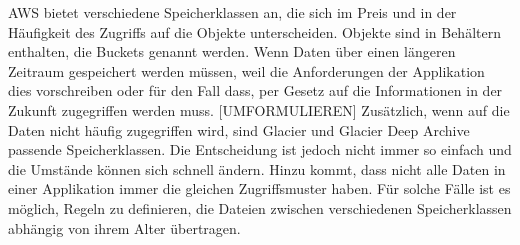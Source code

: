 AWS bietet verschiedene Speicherklassen an, die sich im Preis und in der Häufigkeit des Zugriffs auf die Objekte unterscheiden. Objekte sind in Behältern enthalten, die Buckets genannt werden. Wenn Daten über einen längeren Zeitraum gespeichert werden müssen, weil die Anforderungen der Applikation dies vorschreiben oder für den Fall dass, per Gesetz auf die Informationen in der Zukunft zugegriffen werden muss.
[UMFORMULIEREN]
Zusätzlich, wenn auf die Daten nicht häufig zugegriffen wird, sind Glacier und Glacier Deep Archive passende Speicherklassen. Die Entscheidung ist jedoch nicht immer so einfach und die Umstände können sich schnell ändern. Hinzu kommt, dass nicht alle Daten in einer Applikation immer die gleichen Zugriffsmuster haben. Für solche Fälle ist es möglich, Regeln zu definieren, die Dateien zwischen verschiedenen Speicherklassen abhängig von ihrem Alter übertragen.

